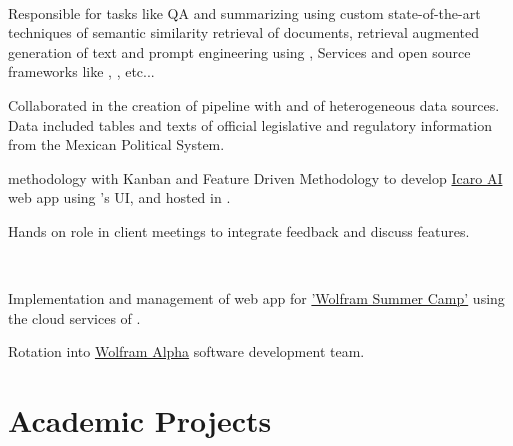 \documentclass[]{deedy-resume-openfont}
\begin{document}
\begin{minipage}[t]{0.66\textwidth}
\\
\begin{tightemize}
\item Responsible for  tasks like QA and summarizing using custom state-of-the-art techniques of semantic similarity retrieval of documents, retrieval augmented generation of text and prompt engineering using ,  Services and open source frameworks like \href{https://docs.llamaindex.ai/en/stable/}{}, \href{https://www.langchain.com/}{}, etc...
\item Collaborated in the creation of  pipeline with  and  of heterogeneous data sources. Data included tables and texts of official legislative and regulatory information from the Mexican Political System.
\item {} methodology with Kanban and Feature Driven Methodology to develop \href{http://www.icaro.ai/home/}{Icaro AI} web app using 's UI,  and hosted in .
\item Hands on role in client meetings to integrate feedback and discuss features.
\end{tightemize}
\sectionsep

\\
\begin{tightemize}
\item Implementation and management of web app for \href{https://education.wolfram.com/summer-camp/}{'Wolfram Summer Camp'} using the cloud services of \href{https://www.wolfram.com/wolfram-one/}{}.
\item Rotation into \href{https://www.wolframalpha.com/}{Wolfram Alpha} software development team. 
\end{tightemize}
\sectionsep


\section{Academic Projects}


\end{minipage}
\end{document}
